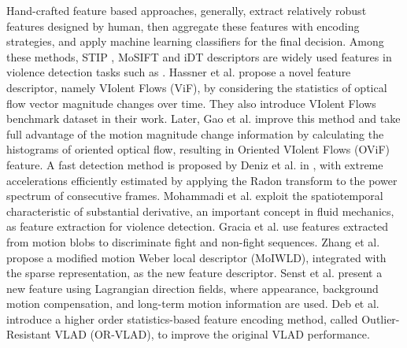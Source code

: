 \documentclass[10pt,twocolumn,letterpaper]{article}
\begin{document}
Hand-crafted feature based approaches, generally, extract relatively robust features designed by human, then aggregate these features with encoding strategies, and apply machine learning classifiers for the final decision.
Among these methods, STIP \cite{STIPs}, MoSIFT \cite{MoSIFT} and iDT \cite{iDTs} descriptors are widely used features in violence detection tasks such as \cite{vio_sift, hockey, mosift_sc}.
Hassner et al. \cite{vif} propose a novel feature descriptor, namely VIolent Flows (ViF), by considering the statistics of optical flow vector magnitude changes over time. They also introduce VIolent Flows benchmark dataset in their work.
Later, Gao et al. \cite{ovif} improve this method and take full advantage of the motion magnitude change information by calculating the histograms of oriented optical flow, resulting in Oriented VIolent Flows (OViF) feature.
A fast detection method is proposed by Deniz et al. in \cite{fast}, with extreme accelerations efficiently estimated by applying the Radon transform to the power spectrum of consecutive frames.
Mohammadi et al. \cite{moha_avss} exploit the spatiotemporal characteristic of substantial derivative, an important concept in fluid mechanics, as feature extraction for violence detection.
Gracia et al. \cite{blob} use features extracted from motion blobs to discriminate fight and non-fight sequences. 
Zhang et al. \cite{MoIWLD} propose a modified motion Weber local descriptor (MoIWLD), integrated with the sparse representation, as the new feature descriptor.
Senst et al. \cite{lagrangian} present a new feature using Lagrangian direction fields, where appearance, background motion compensation, and long-term motion information are used.
Deb et al. \cite{vlad} introduce a higher order statistics-based feature encoding method, called Outlier-Resistant VLAD (OR-VLAD), to improve the original VLAD performance.
\end{document}
